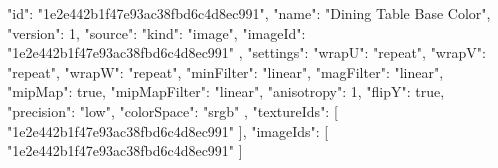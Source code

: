 {
  "id": "1e2e442b1f47e93ac38fbd6c4d8ec991",
  "name": "Dining Table Base Color",
  "version": 1,
  "source": {
    "kind": "image",
    "imageId": "1e2e442b1f47e93ac38fbd6c4d8ec991"
  },
  "settings": {
    "wrapU": "repeat",
    "wrapV": "repeat",
    "wrapW": "repeat",
    "minFilter": "linear",
    "magFilter": "linear",
    "mipMap": true,
    "mipMapFilter": "linear",
    "anisotropy": 1,
    "flipY": true,
    "precision": "low",
    "colorSpace": "srgb"
  },
  "textureIds": [
    "1e2e442b1f47e93ac38fbd6c4d8ec991"
  ],
  "imageIds": [
    "1e2e442b1f47e93ac38fbd6c4d8ec991"
  ]
}
